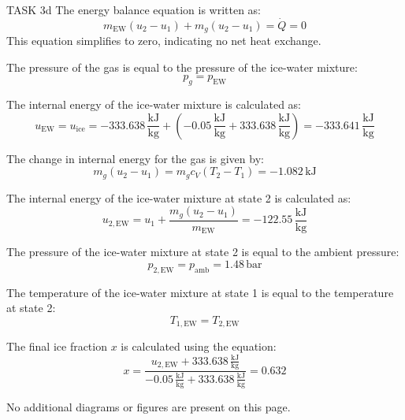 TASK 3d  
The energy balance equation is written as:  
\[
m_{\text{EW}} (u_2 - u_1) + m_g (u_2 - u_1) = \dot{Q} = 0
\]  
This equation simplifies to zero, indicating no net heat exchange.

The pressure of the gas is equal to the pressure of the ice-water mixture:  
\[
p_g = p_{\text{EW}}
\]

The internal energy of the ice-water mixture is calculated as:  
\[
u_{\text{EW}} = u_{\text{ice}} = -333.638 \, \frac{\text{kJ}}{\text{kg}} + \left( -0.05 \, \frac{\text{kJ}}{\text{kg}} + 333.638 \, \frac{\text{kJ}}{\text{kg}} \right) = -333.641 \, \frac{\text{kJ}}{\text{kg}}
\]

The change in internal energy for the gas is given by:  
\[
m_g (u_2 - u_1) = m_g c_V (T_2 - T_1) = -1.082 \, \text{kJ}
\]

The internal energy of the ice-water mixture at state 2 is calculated as:  
\[
u_{2,\text{EW}} = u_1 + \frac{m_g (u_2 - u_1)}{m_{\text{EW}}} = -122.55 \, \frac{\text{kJ}}{\text{kg}}
\]

The pressure of the ice-water mixture at state 2 is equal to the ambient pressure:  
\[
p_{2,\text{EW}} = p_{\text{amb}} = 1.48 \, \text{bar}
\]

The temperature of the ice-water mixture at state 1 is equal to the temperature at state 2:  
\[
T_{1,\text{EW}} = T_{2,\text{EW}}
\]

The final ice fraction \( x \) is calculated using the equation:  
\[
x = \frac{u_{2,\text{EW}} + 333.638 \, \frac{\text{kJ}}{\text{kg}}}{-0.05 \, \frac{\text{kJ}}{\text{kg}} + 333.638 \, \frac{\text{kJ}}{\text{kg}}} = 0.632
\]  

No additional diagrams or figures are present on this page.
